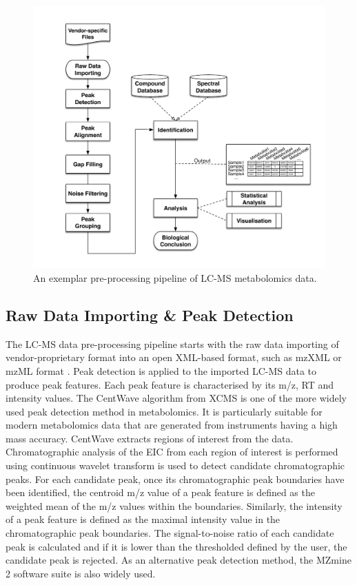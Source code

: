 \begin{figure}
\noindent \centering{}\includegraphics[width=1\textwidth]{02-background/figures/pipeline.pdf}\caption{\label{fig:pipeline}An exemplar pre-processing pipeline of LC-MS metabolomics data.}
\end{figure}

\subsection{Raw Data Importing \& Peak Detection}

The LC-MS data pre-processing pipeline starts with the raw data importing of vendor-proprietary format into an open XML-based format, such as mzXML \cite{Pedrioli2004} or mzML format \cite{martens2011mzml}. Peak detection is applied to the imported LC-MS data to produce peak features. Each peak feature is characterised by its m/z, RT and intensity values. The CentWave algorithm \cite{Tautenhahn2008} from XCMS is one of the more widely used peak detection method in metabolomics. It is particularly suitable for modern metabolomics data that are generated from instruments having a high mass accuracy. CentWave extracts regions of interest from the data. Chromatographic analysis of the EIC from each region of interest is performed using continuous wavelet transform is used to detect candidate chromatographic peaks. For each candidate peak, once its chromatographic peak boundaries have been identified, the centroid m/z value of a peak feature is defined as the weighted mean of the m/z values within the boundaries. Similarly, the intensity of a peak feature is defined as the maximal intensity value in the chromatographic peak boundaries. The signal-to-noise ratio of each candidate peak is calculated and if it is lower than the thresholded defined by the user, the candidate peak is rejected. As an alternative peak detection method, the MZmine 2 \cite{Pluskal2010} software suite is also widely used. 

